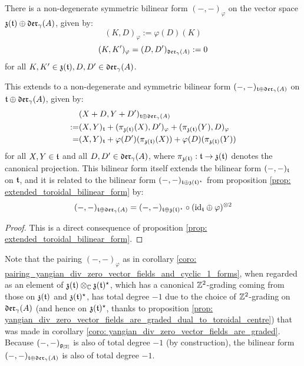         \begin{corollary} \label{coro: pairing_yangian_div_zero_vector_fields_and_cyclic_1_forms}
            There is a non-degenerate symmetric bilinear form $(-, -)_{\varphi}$ on the vector space $\mathfrak{z}(\mathfrak{t}) \oplus \mathfrak{der}_{\gamma}(A)$, given by:
                $$(K, D)_{\varphi} := \varphi(D)(K)$$
                $$(K, K')_{\varphi} = (D, D')_{\mathfrak{der}_{\gamma}(A)} := 0$$
            for all $K, K' \in \mathfrak{z}(\mathfrak{t}), D, D' \in \mathfrak{der}_{\gamma}(A)$.

            This extends to a non-degenerate and symmetric bilinear form $(-, -)_{\mathfrak{t} \oplus \mathfrak{der}_{\gamma}(A)}$ on $\mathfrak{t} \oplus \mathfrak{der}_{\gamma}(A)$, given by:
                $$
                    \begin{aligned}
                        & ( X + D, Y + D' )_{\mathfrak{t} \oplus \mathfrak{der}_{\gamma}(A)}
                        \\
                        := & (X, Y)_{\mathfrak{t}} + ( \pi_{\mathfrak{z}(\mathfrak{t})}(X), D' )_{\varphi} + ( \pi_{\mathfrak{z}(\mathfrak{t})}(Y), D )_{\varphi}
                        \\
                        = & (X, Y)_{\mathfrak{t}} + \varphi(D')( \pi_{\mathfrak{z}(\mathfrak{t})}(X) ) + \varphi(D)( \pi_{\mathfrak{z}(\mathfrak{t})}(Y) )
                    \end{aligned}
                $$
            for all $X, Y \in \mathfrak{t}$ and all $D, D' \in \mathfrak{der}_{\gamma}(A)$, where $\pi_{\mathfrak{z}(\mathfrak{t})}: \mathfrak{t} \to \mathfrak{z}(\mathfrak{t})$ denotes the canonical projection. This bilinear form itself extends the bilinear form $(-, -)_{\mathfrak{t}}$ on $\mathfrak{t}$, and it is related to the bilinear form $(-, -)_{\mathfrak{t} \oplus \mathfrak{z}(\mathfrak{t})^{\star}}$ from proposition \ref{prop: extended_toroidal_bilinear_form} by:
                $$(-, -)_{\toroidal \oplus \divzero} = (-, -)_{\toroidal \oplus \z(\toroidal)^{\star}} \circ ( \id_{\toroidal} \oplus \varphi )^{\tensor 2}$$
        \end{corollary}
            \begin{proof}
                This is a direct consequence of proposition \ref{prop: extended_toroidal_bilinear_form}.
            \end{proof}
        \begin{remark}
            Note that the pairing $(-, -)_{\varphi}$ as in corollary \ref{coro: pairing_yangian_div_zero_vector_fields_and_cyclic_1_forms}, when regarded as an element of $\z(\toroidal) \tensor_{\bbC} \z(\toroidal)^{\star}$, which has a canonical $\mathbb{Z}^2$-grading coming from those on $\mathfrak{z}(\mathfrak{t})$ and $\mathfrak{z}(\mathfrak{t})^{\star}$, has total degree $-1$ due to the choice of $\mathbb{Z}^2$-grading on $\mathfrak{der}_{\gamma}(A)$ (and hence on $\mathfrak{z}(\mathfrak{t})^{\star}$, thanks to proposition \ref{prop: yangian_div_zero_vector_fields_are_graded_dual_to_toroidal_centre}) that was made in corollary \ref{coro: yangian_div_zero_vector_fields_are_graded}. Because $(-, -)_{\mathfrak{g}_{[2]}}$ is also of total degree $-1$ (by construction), the bilinear form $(-, -)_{\mathfrak{t} \oplus \mathfrak{der}_{\gamma}(A)}$ is also of total degree $-1$.
        \end{remark}

